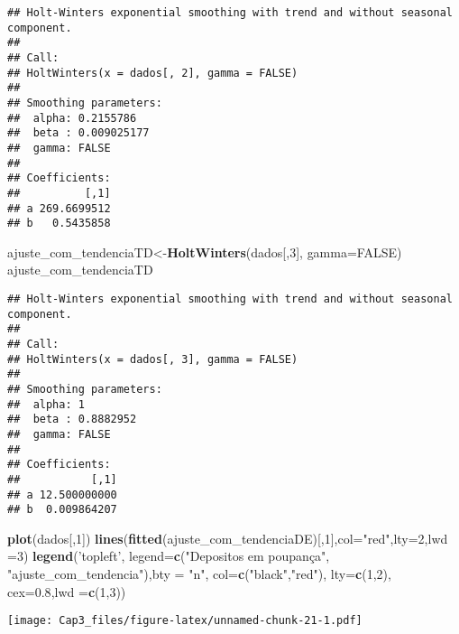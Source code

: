 \documentclass[]{article}
\newenvironment{Shaded}{\begin{snugshade}}{\end{snugshade}}
\newcommand{\DataTypeTok}[1]{\textcolor[rgb]{0.13,0.29,0.53}{#1}}
\newcommand{\DecValTok}[1]{\textcolor[rgb]{0.00,0.00,0.81}{#1}}
\newcommand{\FloatTok}[1]{\textcolor[rgb]{0.00,0.00,0.81}{#1}}
\newcommand{\KeywordTok}[1]{\textcolor[rgb]{0.13,0.29,0.53}{\textbf{#1}}}
\newcommand{\NormalTok}[1]{#1}
\newcommand{\OtherTok}[1]{\textcolor[rgb]{0.56,0.35,0.01}{#1}}
\newcommand{\StringTok}[1]{\textcolor[rgb]{0.31,0.60,0.02}{#1}}
\begin{document}
\begin{verbatim}
## Holt-Winters exponential smoothing with trend and without seasonal component.
## 
## Call:
## HoltWinters(x = dados[, 2], gamma = FALSE)
## 
## Smoothing parameters:
##  alpha: 0.2155786
##  beta : 0.009025177
##  gamma: FALSE
## 
## Coefficients:
##          [,1]
## a 269.6699512
## b   0.5435858
\end{verbatim}

\begin{Shaded}
\begin{Highlighting}[]
\NormalTok{ajuste_com_tendenciaTD<-}\KeywordTok{HoltWinters}\NormalTok{(dados[,}\DecValTok{3}\NormalTok{], }\DataTypeTok{gamma=}\OtherTok{FALSE}\NormalTok{)}
\NormalTok{ajuste_com_tendenciaTD}
\end{Highlighting}
\end{Shaded}

\begin{verbatim}
## Holt-Winters exponential smoothing with trend and without seasonal component.
## 
## Call:
## HoltWinters(x = dados[, 3], gamma = FALSE)
## 
## Smoothing parameters:
##  alpha: 1
##  beta : 0.8882952
##  gamma: FALSE
## 
## Coefficients:
##           [,1]
## a 12.500000000
## b  0.009864207
\end{verbatim}

\begin{Shaded}
\begin{Highlighting}[]
\KeywordTok{plot}\NormalTok{(dados[,}\DecValTok{1}\NormalTok{])}
\KeywordTok{lines}\NormalTok{(}\KeywordTok{fitted}\NormalTok{(ajuste_com_tendenciaDE)[,}\DecValTok{1}\NormalTok{],}\DataTypeTok{col=}\StringTok{"red"}\NormalTok{,}\DataTypeTok{lty=}\DecValTok{2}\NormalTok{,}\DataTypeTok{lwd =}\DecValTok{3}\NormalTok{)}
\KeywordTok{legend}\NormalTok{(}\StringTok{'topleft'}\NormalTok{, }\DataTypeTok{legend=}\KeywordTok{c}\NormalTok{(}\StringTok{"Depositos em poupança"}\NormalTok{, }\StringTok{"ajuste_com_tendencia"}\NormalTok{),}\DataTypeTok{bty =} \StringTok{"n"}\NormalTok{,}
       \DataTypeTok{col=}\KeywordTok{c}\NormalTok{(}\StringTok{"black"}\NormalTok{,}\StringTok{"red"}\NormalTok{), }\DataTypeTok{lty=}\KeywordTok{c}\NormalTok{(}\DecValTok{1}\NormalTok{,}\DecValTok{2}\NormalTok{), }\DataTypeTok{cex=}\FloatTok{0.8}\NormalTok{,}\DataTypeTok{lwd =}\KeywordTok{c}\NormalTok{(}\DecValTok{1}\NormalTok{,}\DecValTok{3}\NormalTok{))}
\end{Highlighting}
\end{Shaded}

\texttt{[image: Cap3\_files/figure-latex/unnamed-chunk-21-1.pdf]}
\end{document}
